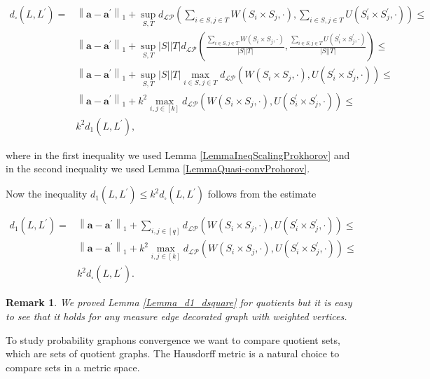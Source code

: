 \documentclass[11pt]{article}
\newtheorem{remark}[theorem]{Remark}
\begin{document}
$$\begin{aligned}
    d_{\square}\left(L, L^{\prime}\right)=&\left\|\mathbf{a}-\mathbf{a}^{\prime}\right\|_1+\sup_{S,T}d_{\mathcal{LP}}(\sum_{i\in S, j \in T}W(S_i \times S_j,\cdot),\sum_{i\in S, j \in T}U(S_i^{\prime} \times S_j^{\prime},\cdot))\leq\\
&   \left\|\mathbf{a}-\mathbf{a}^{\prime}\right\|_1+\sup_{S,T}|S||T|d_{\mathcal{LP}}\left(\frac{\sum_{i\in S, j \in T}W(S_i \times S_j,\cdot)}{|S||T|},\frac{\sum_{i\in S, j \in T}U(S_i^{\prime} \times S_j^{\prime},\cdot)}{|S||T|}\right)\leq \\
&\left\|\mathbf{a}-\mathbf{a}^{\prime}\right\|_1+\sup_{S,T}|S||T|\max_{i\in S, j \in T}d_{\mathcal{LP}}(W(S_i \times S_j,\cdot),U(S_i^{\prime} \times S_j^{\prime},\cdot))\leq  \\
& \left\|\mathbf{a}-\mathbf{a}^{\prime}\right\|_1+k^2\max_{i,j \in [k]}d_{\mathcal{LP}}(W(S_i \times S_j,\cdot),U(S_i^{\prime} \times S_j^{\prime},\cdot))\leq \\ 
    &    k^2d_1\left(L, L^{\prime}\right),
\end{aligned}$$

where in the first inequality we used Lemma \ref{LemmaIneqScalingProkhorov} and in the second inequality we used Lemma \ref{LemmaQuasi-convProhorov}.

Now the inequality $d_{1}\left(L, L^{\prime}\right)\leq k^2d_{\square}\left(L, L^{\prime}\right)$ follows from the estimate

$$
\begin{aligned}
d_1\left(L, L^{\prime}\right)=&
\left\|\mathbf{a}-\mathbf{a}^{\prime}\right\|_1+\sum_{i, j \in[q]}d_{\mathcal{LP}}(W(S_i \times S_j,\cdot),U(S_i^{\prime} \times S_j^{\prime},\cdot)) \leq \\
& \left\|\mathbf{a}-\mathbf{a}^{\prime}\right\|_1+k^2 \max_{i,j\in[k]}d_{\mathcal{LP}}(W(S_i \times S_j,\cdot),U(S_i^{\prime} \times S_j^{\prime},\cdot)) \leq \\
& k^2d_{\square}\left(L, L^{\prime}\right).
\end{aligned}
$$
\endproof

\begin{remark}
We proved Lemma \ref{Lemma_d1_dsquare} for quotients but it is easy to see that it holds for any measure edge decorated graph with weighted vertices.    
\end{remark}
To study probability graphons convergence we want to compare quotient sets, which are sets of quotient graphs. The Hausdorff metric is a natural choice to compare sets in a metric space.
\end{document}
